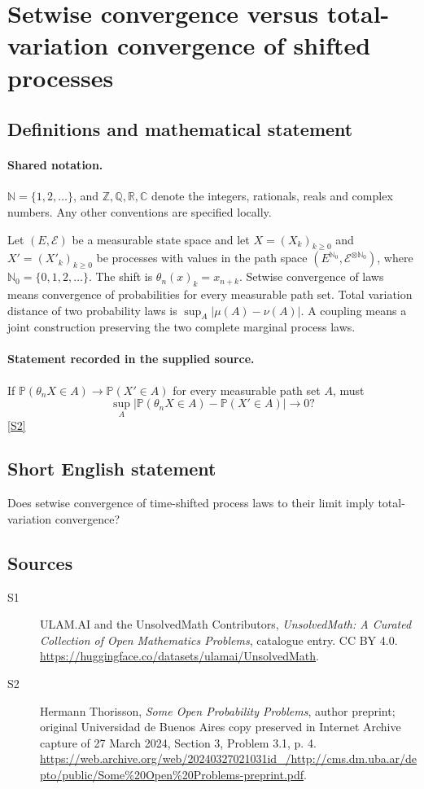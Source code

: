 \documentclass[11pt]{article}
\newcommand{\sref}[2]{\hyperlink{source:#1:#2}{[S#2]}}
\begin{document}
\section{Setwise convergence versus total-variation convergence of shifted processes}\label{statement}

\subsection{Definitions and mathematical statement}

\paragraph{Shared notation.}$\mathbb N=\{1,2,\ldots\}$, and $\mathbb Z,\mathbb Q,\mathbb R,\mathbb C$ denote the integers, rationals, reals and complex numbers. Any other conventions are specified locally.


Let $(E,\mathcal E)$ be a measurable state space and let $X=(X_k)_{k\ge0}$ and $X'=(X'_k)_{k\ge0}$ be processes with values in the path space $(E^{\mathbb N_0},\mathcal E^{\otimes\mathbb N_0})$, where $\mathbb N_0=\{0,1,2,\ldots\}$. The shift is $\theta_n(x)_k=x_{n+k}$. Setwise convergence of laws means convergence of probabilities for every measurable path set. Total variation distance of two probability laws is $\sup_A|\mu(A)-\nu(A)|$. A coupling means a joint construction preserving the two complete marginal process laws.
\paragraph{Statement recorded in the supplied source.}
If $\mathbb P(\theta_nX\in A)\to\mathbb P(X'\in A)$ for every measurable path set $A$, must
\[\sup_A|\mathbb P(\theta_nX\in A)-\mathbb P(X'\in A)|\longrightarrow0?\] \sref{statement}{2}
\subsection{Short English statement}
Does setwise convergence of time-shifted process laws to their limit imply total-variation convergence?
\subsection{Sources}
\begin{description}
\item[\hypertarget{source:statement:1}{S1}] ULAM.AI and the UnsolvedMath Contributors, \emph{UnsolvedMath: A Curated Collection of Open Mathematics Problems}, catalogue entry. CC BY 4.0. \url{https://huggingface.co/datasets/ulamai/UnsolvedMath}.
\item[\hypertarget{source:statement:2}{S2}] Hermann Thorisson, \emph{Some Open Probability Problems}, author preprint; original Universidad de Buenos Aires copy preserved in Internet Archive capture of 27 March 2024, Section 3, Problem 3.1, p. 4. \url{https://web.archive.org/web/20240327021031id_/http://cms.dm.uba.ar/depto/public/Some%20Open%20Problems-preprint.pdf}.
\end{description}
\label{end:statement}
\end{document}
